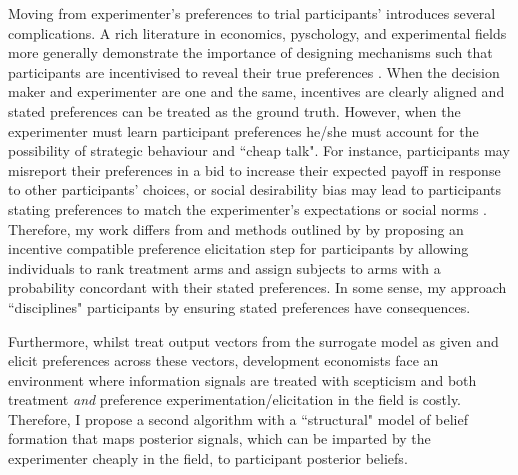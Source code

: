 \documentclass[twoside,11pt]{article}
\begin{document}
Moving from experimenter's preferences to trial participants' introduces several 
complications. A rich literature in economics, pyschology, and experimental fields 
more generally demonstrate 
the importance of designing mechanisms such that participants are incentivised 
to reveal their true preferences \citep{Savage1971,ar-delavande}. When the decision maker and experimenter are 
one and the same, 
incentives are clearly aligned and stated preferences can be treated as the ground 
truth. However, when the experimenter must learn participant 
preferences he/she must account for the possibility of strategic behaviour and 
``cheap talk". For instance, participants may misreport their preferences in a bid
to increase their expected payoff in response to other participants' choices, or 
social desirability bias may lead to participants stating preferences to match 
the experimenter's expectations or social norms \citep{brownback2018a}. Therefore, my work 
differs from \cite{lin2022preference} and methods outlined by \citep{furnkranz2010a} by proposing 
an incentive compatible 
preference elicitation step for participants by allowing individuals
to rank treatment arms and assign subjects to arms with a probability
concordant with their stated preferences. In some sense, my approach ``disciplines"
participants by ensuring stated preferences have consequences.


Furthermore, whilst \cite{lin2022preference} treat output vectors from the surrogate 
model as given and elicit preferences across these vectors, development economists 
face an environment where information signals are treated with 
scepticism and both treatment \textit{and} preference experimentation/elicitation
 in the field is costly. Therefore, I propose a second algorithm with a ``structural" 
 model of belief formation that maps posterior signals, which can be imparted by 
 the experimenter cheaply in the field, to participant posterior beliefs.



\end{document}
